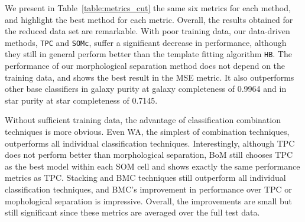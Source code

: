 \documentclass[useAMS,usenatbib]{mn2e}
\begin{document}
We present in Table~\ref{table:metrics_cut}
the same six metrics for each method,
and highlight the best method for each metric.
Overall, the results obtained for the reduced data set are remarkable.
With poor training data, our data-driven methods,
\texttt{TPC} and \texttt{SOMc},
suffer a significant decrease in performance,
although they still in general perform better than 
the template fitting algorithm
\texttt{HB}.
The performance of our morphological separation method
does not depend on the training data,
and shows the best result in the MSE metric.
It also outperforms other base classifiers
in galaxy purity at galaxy completeness of 0.9964
and in star purity at star completeness of 0.7145.

Without sufficient training data,
the advantage of classification combination techniques
is more obvious.
Even WA, the simplest of combination techniques, outperforms
all individual classification techniques.
Interestingly, although TPC does not perform better
than morphological separation,
BoM still chooses TPC as the best model within each SOM cell
and shows exactly the same performance metrics as TPC.
Stacking and BMC techniques still outperform
all individual classification techniques,
and BMC's improvement in performance over TPC or mophological separation
is impressive.
Overall, the improvements are small but still significant
since these metrics are averaged over the full test data.



\end{document}
